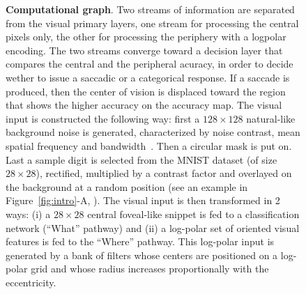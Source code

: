 \begin{figure}[t!]%
	\caption{%
		{\bf Computational graph}. Two streams of information are separated from the visual primary layers, one stream for processing the central pixels only, the other for processing the periphery with a logpolar encoding. The two streams converge toward a decision layer that compares the central and the peripheral acuracy, in order to decide wether to issue a saccadic or a categorical response. If a saccade is produced, then the center of vision is displaced toward the region that shows the higher accuracy on the accuracy map.
		\A The visual input is constructed the following way: first a  $128\times 128$  natural-like background noise is generated, characterized by noise contrast, mean spatial frequency and bandwidth~\cite{Sanz12}. Then a circular mask is put on. Last a sample digit is selected from the MNIST dataset (of size $28\times 28$), rectified, multiplied by a contrast factor and overlayed on the background at a random position (see an example in Figure~\ref{fig:intro}-A, \DIS ). %
		\B The visual input is then transformed in 2 ways: (i) a $28\times 28$ central foveal-like snippet is fed to a classification network (``What'' pathway) and (ii) a log-polar set of oriented visual features is fed to the ``Where'' pathway. This log-polar input is generated by a bank of filters whose centers are positioned on a log-polar grid and whose radius increases proportionally with the eccentricity. %
		\C 
}
\end{figure}
